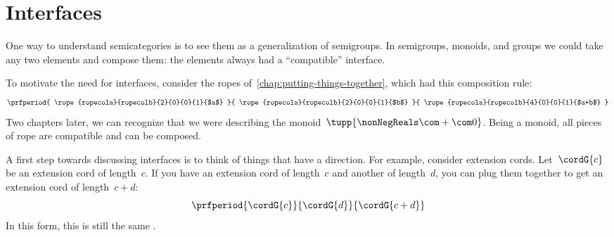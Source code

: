 
\section{Interfaces}\label{sec:interfaces}

One way to understand semicategories is to see them as a generalization of semigroups.
In semigroups, monoids, and groups we could take any two elements and compose them: the elements always had a ``compatible'' interface.

To motivate the need for interfaces, consider the ropes of~\cref{chap:putting-things-together}, which had this composition rule:
%
\begin{equation}
    \prfperiod{
        \rope{ropecola}{ropecolb}{2}{0}{0}{1}{$a$}
    }{
        \rope{ropecola}{ropecolb}{2}{0}{0}{1}{$b$}
    }{
        \rope{ropecola}{ropecolb}{4}{0}{0}{1}{$a+b$}
    }
\end{equation}
%
Two chapters later, we can recognize that we were describing the monoid~$\tupp{\nonNegReals \com + \com 0}$.
Being a monoid, all pieces of rope are compatible and can be composed.

A first step towards discussing interfaces is to think of things that have a direction.
For example, consider extension cords.
Let~$\cordG{c}$ be an extension cord of length~$c$.
If you have an extension cord of length~$c$ and another of length~$d$, you can plug them together to get an extension cord of length~$c+d$:
%
\begin{equation}
    \label{eq:cords}
    \prfperiod{
        \cordG{c}
    }{
        \cordG{d}
    }{
        \cordG{c+d}
    }
\end{equation}
%
In this form, this is still the same .

